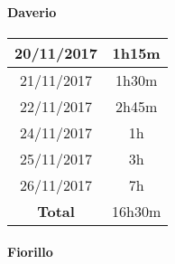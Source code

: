\paragraph*{Daverio}

\begin{tabular}{|c|c|}

	\hline 

20/11/2017	& 1h15m \\ 

	\hline 

21/11/2017	& 1h30m \\ 

	\hline 

22/11/2017	& 2h45m \\ 

	\hline 

24/11/2017	& 1h \\ 

	\hline 

25/11/2017	& 3h \\ 

	\hline 

26/11/2017	& 7h \\ 

	\hline 

\textbf{Total}	& 16h30m \\ 

	\hline 

\end{tabular}


\paragraph*{Fiorillo}

